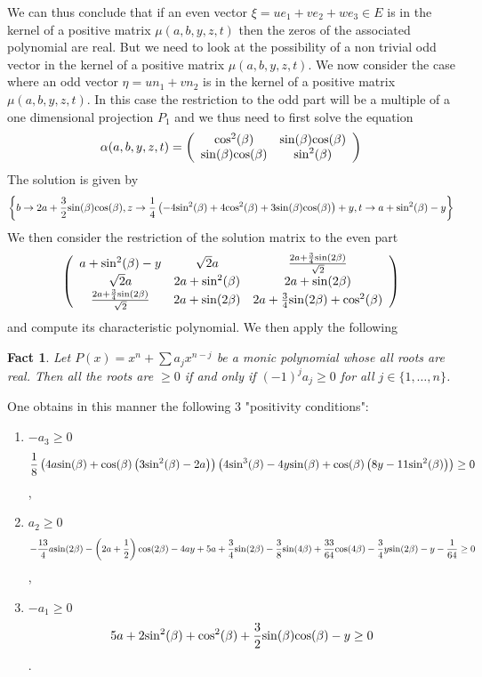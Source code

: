 \documentclass{amsart}
\newtheorem{fact}[thm]{Fact}
\def\sin{{{\rm sin}}}
\def\cos{{{\rm cos}}}
\def\sin{{{\rm sin}}}
\def\cos{{{\rm cos}}}
\begin{document}
We can thus conclude that if an even vector $\xi=u e_1+v e_2+w e_3\in E$ is in the kernel of a positive matrix $\mu(a,b,y,z,t)$ then the zeros of the associated polynomial are real. But we need to look at the possibility of a non trivial odd vector in the kernel of a positive matrix $\mu(a,b,y,z,t)$. \newline
We now consider the case where an odd vector $\eta=u n_1+ v n_2$ is in the kernel of a positive matrix $\mu(a,b,y,z,t)$. In this case the restriction to the odd part will be a multiple of a one dimensional projection $P_1$ and we thus need to first solve the equation 
$$
\alpha(a,b,y,z,t)=\left(
\begin{array}{cc}
 \cos ^2(\beta ) & \sin (\beta ) \cos (\beta ) \\
 \sin (\beta ) \cos (\beta ) & \sin ^2(\beta ) \\
\end{array}
\right)
$$
The solution is given by 
$$
\left\{b\to 2 a+\frac{3}{2} \sin (\beta ) \cos (\beta ),z\to \frac{1}{4} \left(-4 \sin ^2(\beta )+4 \cos ^2(\beta )+3 \sin (\beta ) \cos (\beta )\right)+y,t\to a+\sin ^2(\beta )-y\right\}
$$
We then consider the restriction of the solution matrix to the even part 
$$
\left(
\begin{array}{ccc}
 a+\sin ^2(\beta )-y & \sqrt{2} a & \frac{2 a+\frac{3}{4} \sin (2 \beta )}{\sqrt{2}} \\
 \sqrt{2} a & 2 a+\sin ^2(\beta ) & 2 a+\sin (2 \beta ) \\
 \frac{2 a+\frac{3}{4} \sin (2 \beta )}{\sqrt{2}} & 2 a+\sin (2 \beta ) & 2 a+\frac{3}{4} \sin (2 \beta )+\cos ^2(\beta ) \\
\end{array}
\right)$$
and compute its characteristic polynomial. We then apply the following
\begin{fact} Let $P(x)=x^n+\sum a_j x^{n-j}$ be a monic polynomial whose all roots are real. Then all the roots are $\geq 0$ if and only if $(-1)^ja_j\geq 0$ for all $j\in \{1, \ldots, n\}$.	
\end{fact}
One obtains in this manner the following $3$ "positivity conditions":
\begin{enumerate}
	\item  $-a_3\geq 0$ $$\frac{1}{8} \left(4 a \sin (\beta )+\cos (\beta ) \left(3 \sin ^2(\beta )-2 a\right)\right) \left(4 \sin ^3(\beta )-4 y \sin (\beta )+\cos (\beta ) \left(8 y-11 \sin ^2(\beta )\right)\right)\geq 0$$,
	\item $a_2\geq 0$
	 $$-\frac{13}{4} a \sin (2 \beta )-\left(2 a+\frac{1}{2}\right) \cos (2 \beta )-4 a y+5 a+\frac{3}{4} \sin (2 \beta )-\frac{3}{8} \sin (4 \beta )+\frac{33}{64} \cos (4 \beta )-\frac{3}{4} y \sin (2 \beta )-y-\frac{1}{64}\geq 0$$,
	\item $-a_1\geq 0$ $$5 a+2 \sin ^2(\beta )+\cos ^2(\beta )+\frac{3}{2} \sin (\beta ) \cos (\beta )-y\geq 0$$.
	\end{enumerate}
\end{document}
